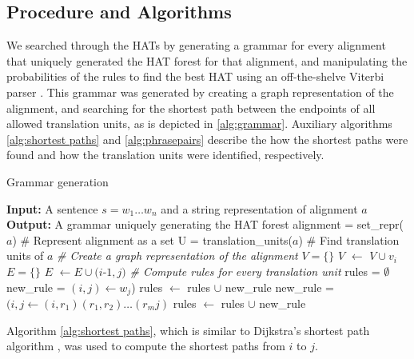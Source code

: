 \documentclass[a4paper, 11pt]{report}
\theoremstyle{definition}
\theoremstyle{plain}
\begin{document}
\subsection{Procedure and Algorithms}

We searched through the HATs by generating a grammar for every alignment that uniquely generated the HAT forest for that alignment, and manipulating the probabilities of the rules to find the best HAT using an off-the-shelve Viterbi parser \citep{bird2009natural}. This grammar was generated by creating a graph representation of the alignment, and searching for the shortest path between the endpoints of all allowed translation units, as is depicted in \ref{alg:grammar}. Auxiliary algorithms \ref{alg:shortest paths} and \ref{alg:phrasepairs} describe the how the shortest paths were found and how the translation units were identified, respectively.

\begin{algorithm}
\caption{Grammar generation}\label{alg:grammar}
\begin{algorithmic}
\STATE \textbf{Input:} A sentence $s = w_1\ldots w_n$ and a string representation of alignment $a$
\STATE \textbf{Output:} A grammar uniquely generating the HAT forest
\STATE %
\STATE alignment = set\_repr($a$) \hfill \# Represent alignment as a set
\STATE U = translation\_units($a$) \hfill \# Find translation units of $a$ 
\STATE \textit{\# Create a graph representation of the alignment}
\STATE $V = \{\}$
	\STATE $V$ $\leftarrow$ $V\cup v_i$
\ENDFOR
\STATE $E=\{\}$
	\STATE $E$ $\leftarrow E\cup (i$-$1,j)$
\ENDFOR
\STATE \textit{\# Compute rules for every translation unit}
\STATE rules = $\emptyset$
		\STATE new\_rule = $(i,j) \leftarrow w_j$)
		\STATE rules $\leftarrow$ rules $\cup$ new\_rule 
	\ELSE
			\STATE new\_rule = $(i,j \leftarrow (i,r_1) (r_1, r_2) \ldots (r_m j)$
			\STATE rules $\leftarrow$ rules $\cup$ new\_rule
		\ENDFOR
	\ENDIF
\ENDFOR
\end{algorithmic}
\end{algorithm}

Algorithm \ref{alg:shortest paths}, which is similar to Dijkstra's shortest path algorithm \citep{dijkstra1959note}, was used to compute the shortest paths from $i$ to $j$.
\end{document}
